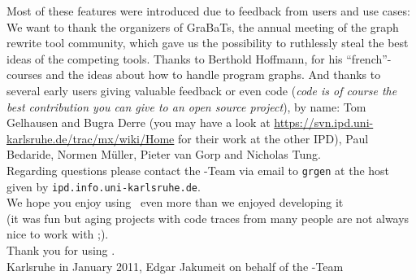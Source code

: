 Most of these features were introduced due to feedback from users and use cases:\\
We want to thank the organizers of GraBaTs\cite{grabats}, the annual meeting of the graph rewrite tool community,
which gave us the possibility to ruthlessly steal the best ideas of the competing tools.
Thanks to Berthold Hoffmann, for his ``french''-courses and the ideas about how to handle program graphs.
And thanks to several early users giving valuable feedback or even code (\emph{code is of course the best contribution you can give to an open source project}), by name: 
Tom Gelhausen and Bugra Derre (you may have a look at \url{https://svn.ipd.uni-karlsruhe.de/trac/mx/wiki/Home} for their work at the other IPD), Paul Bedaride, Normen Müller, Pieter van Gorp and Nicholas Tung.
\\[1ex]

\noindent Regarding questions please contact the \GrG-Team 
via email to \texttt{grgen} at the host given by \texttt{ipd.info.uni-karlsruhe.de}.\\[1ex]

\noindent We hope you enjoy using \GrG\ even more than we enjoyed developing it\\ {\small(it was fun but aging projects with code traces from many people are not always nice to work with ;).}
\\[1ex]

Thank you for using \GrG.\\[2ex]

\noindent Karlsruhe in January 2011, Edgar Jakumeit on behalf of the \GrG-Team
